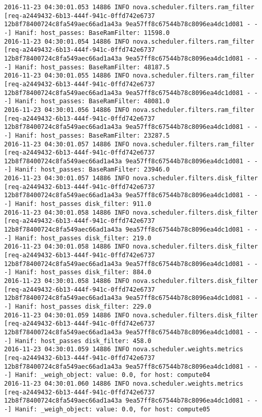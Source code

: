 \begin{lstlisting}[frame=single, caption={The filter scheduler log trace for 10 virtual instances}, label={lst:filterschedulercodetracelog10vi}, escapechar=|]
2016-11-23 04:30:01.053 14886 INFO nova.scheduler.filters.ram_filter [req-a2449432-6b13-444f-941c-0ffd742e6737 12b8f78400724c8fa549aec66ad1a43a 9ea57ff8c67544b78c8096ea4dc1d081 - - -] Hanif: host_passes: BaseRamFilter: 11598.0
2016-11-23 04:30:01.054 14886 INFO nova.scheduler.filters.ram_filter [req-a2449432-6b13-444f-941c-0ffd742e6737 12b8f78400724c8fa549aec66ad1a43a 9ea57ff8c67544b78c8096ea4dc1d081 - - -] Hanif: host_passes: BaseRamFilter: 48187.5
2016-11-23 04:30:01.055 14886 INFO nova.scheduler.filters.ram_filter [req-a2449432-6b13-444f-941c-0ffd742e6737 12b8f78400724c8fa549aec66ad1a43a 9ea57ff8c67544b78c8096ea4dc1d081 - - -] Hanif: host_passes: BaseRamFilter: 48081.0
2016-11-23 04:30:01.056 14886 INFO nova.scheduler.filters.ram_filter [req-a2449432-6b13-444f-941c-0ffd742e6737 12b8f78400724c8fa549aec66ad1a43a 9ea57ff8c67544b78c8096ea4dc1d081 - - -] Hanif: host_passes: BaseRamFilter: 23287.5
2016-11-23 04:30:01.057 14886 INFO nova.scheduler.filters.ram_filter [req-a2449432-6b13-444f-941c-0ffd742e6737 12b8f78400724c8fa549aec66ad1a43a 9ea57ff8c67544b78c8096ea4dc1d081 - - -] Hanif: host_passes: BaseRamFilter: 23946.0
2016-11-23 04:30:01.057 14886 INFO nova.scheduler.filters.disk_filter [req-a2449432-6b13-444f-941c-0ffd742e6737 12b8f78400724c8fa549aec66ad1a43a 9ea57ff8c67544b78c8096ea4dc1d081 - - -] Hanif: host_passes disk_filter: 911.0
2016-11-23 04:30:01.058 14886 INFO nova.scheduler.filters.disk_filter [req-a2449432-6b13-444f-941c-0ffd742e6737 12b8f78400724c8fa549aec66ad1a43a 9ea57ff8c67544b78c8096ea4dc1d081 - - -] Hanif: host_passes disk_filter: 219.0
2016-11-23 04:30:01.058 14886 INFO nova.scheduler.filters.disk_filter [req-a2449432-6b13-444f-941c-0ffd742e6737 12b8f78400724c8fa549aec66ad1a43a 9ea57ff8c67544b78c8096ea4dc1d081 - - -] Hanif: host_passes disk_filter: 884.0
2016-11-23 04:30:01.058 14886 INFO nova.scheduler.filters.disk_filter [req-a2449432-6b13-444f-941c-0ffd742e6737 12b8f78400724c8fa549aec66ad1a43a 9ea57ff8c67544b78c8096ea4dc1d081 - - -] Hanif: host_passes disk_filter: 229.0
2016-11-23 04:30:01.059 14886 INFO nova.scheduler.filters.disk_filter [req-a2449432-6b13-444f-941c-0ffd742e6737 12b8f78400724c8fa549aec66ad1a43a 9ea57ff8c67544b78c8096ea4dc1d081 - - -] Hanif: host_passes disk_filter: 458.0
2016-11-23 04:30:01.059 14886 INFO nova.scheduler.weights.metrics [req-a2449432-6b13-444f-941c-0ffd742e6737 12b8f78400724c8fa549aec66ad1a43a 9ea57ff8c67544b78c8096ea4dc1d081 - - -] Hanif: _weigh_object: value: 0.0, for host: compute04
2016-11-23 04:30:01.060 14886 INFO nova.scheduler.weights.metrics [req-a2449432-6b13-444f-941c-0ffd742e6737 12b8f78400724c8fa549aec66ad1a43a 9ea57ff8c67544b78c8096ea4dc1d081 - - -] Hanif: _weigh_object: value: 0.0, for host: compute05

\end{lstlisting}
